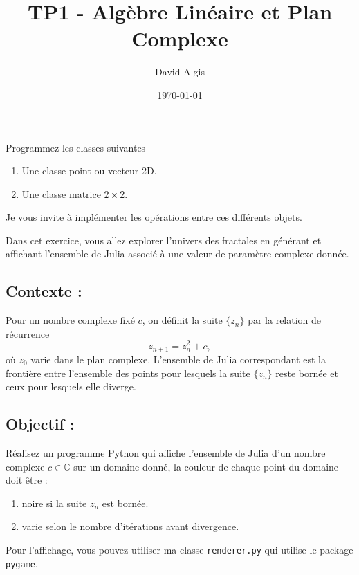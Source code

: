 \documentclass[a4paper,12pt]{article}
\title{TP1 - Algèbre Linéaire et Plan Complexe}
\author{David Algis}
\date{\today}
\begin{document}
\makeonlytitle




Programmez les classes suivantes
\begin{enumerate}
    \item Une classe point ou vecteur 2D.
    \item Une classe matrice $2\times2$.
\end{enumerate}

Je vous invite à implémenter les opérations entre ces différents objets.




Dans cet exercice, vous allez explorer l'univers des fractales en générant et affichant l'ensemble de Julia associé à une valeur de paramètre complexe donnée. 


\subsection{Contexte :}
Pour un nombre complexe fixé \( c \), on définit la suite \(\{z_n\}\) par la relation de récurrence
\[
z_{n+1} = z_n^2 + c,
\]
où \(z_0\) varie dans le plan complexe. L'ensemble de Julia correspondant est la frontière entre l'ensemble des points pour lesquels la suite \(\{z_n\}\) reste bornée et ceux pour lesquels elle diverge.

\bigskip

\subsection{Objectif :}
Réalisez un programme Python qui affiche l'ensemble de Julia d'un nombre complexe $c\in \mathbb{C}$ sur un domaine donné, la couleur de chaque point du domaine doit être :
\begin{enumerate}
    \item noire si la suite $z_n$ est bornée.
    \item varie selon le nombre d'itérations avant divergence.
\end{enumerate}

Pour l'affichage, vous pouvez utiliser ma classe \texttt{renderer.py} qui utilise le package \texttt{pygame}.

\end{document}

